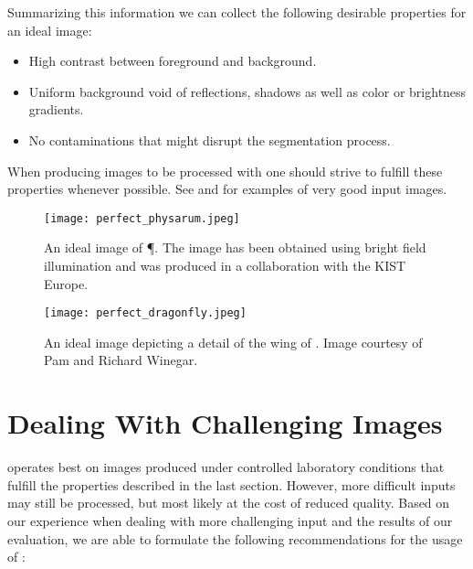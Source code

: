 	Summarizing this information we can collect the following desirable properties for an ideal image:

	\begin{itemize}
		\item High contrast between foreground and background.
		\item Uniform background void of reflections, shadows as well as color or brightness gradients.
		\item No contaminations that might disrupt the segmentation process.
	\end{itemize}

	When producing images to be processed with \NEFI one should strive to fulfill these properties whenever possible. See  and  for examples of very good input images.

	\begin{figure}
		\centering
		\texttt{[image: perfect\_physarum.jpeg]}
		\caption[\NEFIs strengths - An ideal image of \P]{An ideal image of \P. The image has been obtained using bright field illumination and was produced in a collaboration with the KIST Europe.}
		\label{fig:sup:good1}
	\end{figure}

	\begin{figure}
		\centering
		\texttt{[image: perfect\_dragonfly.jpeg]}
		\caption[\NEFIs strengths - An ideal image of \A]{An ideal image depicting a detail of the wing of \A. Image courtesy of Pam and Richard Winegar.}
		\label{fig:sup:good2}
	\end{figure}
 
\section{Dealing With Challenging Images}

	\NEFI operates best on images produced under controlled laboratory conditions that fulfill the properties described in the last section. However, more difficult inputs may still be processed, but most likely at the cost of reduced quality. Based on our experience when dealing with more challenging input and the results of our evaluation, we are able to formulate the following recommendations for the usage of \NEFI:

